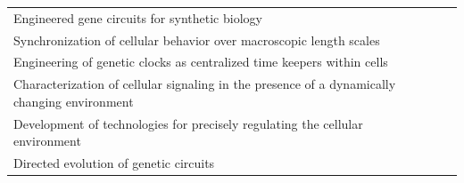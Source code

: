 \begin{tabular}{lll} 
Engineered gene circuits for synthetic biology\\
Synchronization of cellular behavior over macroscopic length scales\\
Engineering of genetic clocks as centralized time keepers within cells\\
Characterization of cellular signaling in the presence of a dynamically changing environment\\
Development of technologies for precisely regulating the cellular environment\\
Directed evolution of genetic circuits\\ 
\end{tabular}\\

